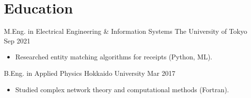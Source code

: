 \documentclass[11pt,a4paper]{moderncv}
\begin{document}
\section{Education}

\cventry
    {M.Eng. in Electrical Engineering \& Information Systems}
    {The University of Tokyo}
    {Sep 2021}
    {}
    {
      \begin{itemize}
        \item Researched entity matching algorithms for receipts (Python, ML).
      \end{itemize}
    }

\cventry
    {B.Eng. in Applied Physics}
    {Hokkaido University}
    {Mar 2017}
    {}
    {
      \begin{itemize}
        \item Studied complex network theory and computational methods (Fortran).
      \end{itemize}
    }
\end{document}
